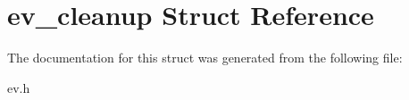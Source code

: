 \hypertarget{structev__cleanup}{}\section{ev\+\_\+cleanup Struct Reference}
\label{structev__cleanup}


The documentation for this struct was generated from the following file\+:\begin{DoxyCompactItemize}
\item 
ev.\+h\end{DoxyCompactItemize}
